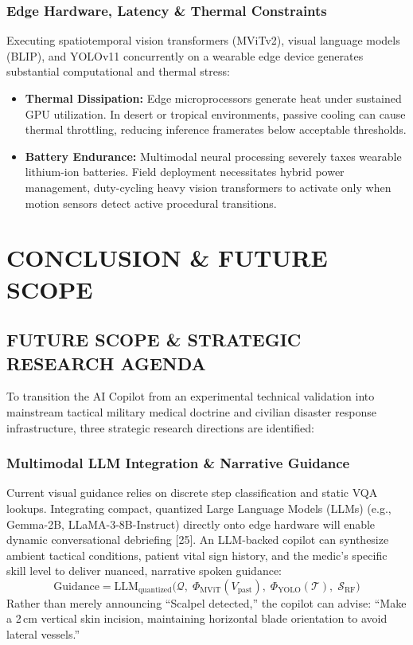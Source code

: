 \documentclass[12pt,a4paper]{report}
\begin{document}
\subsection{Edge Hardware, Latency \& Thermal Constraints}
Executing spatiotemporal vision transformers (MViTv2), visual language models (BLIP), and YOLOv11 concurrently on a wearable edge device generates substantial computational and thermal stress:
\begin{itemize}
    \item \textbf{Thermal Dissipation:} Edge microprocessors generate heat under sustained GPU utilization. In desert or tropical environments, passive cooling can cause thermal throttling, reducing inference framerates below acceptable thresholds.
    \item \textbf{Battery Endurance:} Multimodal neural processing severely taxes wearable lithium-ion batteries. Field deployment necessitates hybrid power management, duty-cycling heavy vision transformers to activate only when motion sensors detect active procedural transitions.
\end{itemize}

\newpage
\chapter{CONCLUSION \& FUTURE SCOPE}

\section{FUTURE SCOPE \& STRATEGIC RESEARCH AGENDA}

To transition the AI Copilot from an experimental technical validation into mainstream tactical military medical doctrine and civilian disaster response infrastructure, three strategic research directions are identified:

\subsection{Multimodal LLM Integration \& Narrative Guidance}
Current visual guidance relies on discrete step classification and static VQA lookups. Integrating compact, quantized Large Language Models (LLMs) (e.g., Gemma-2B, LLaMA-3-8B-Instruct) directly onto edge hardware will enable dynamic conversational debriefing [25]. An LLM-backed copilot can synthesize ambient tactical conditions, patient vital sign history, and the medic's specific skill level to deliver nuanced, narrative spoken guidance:
\begin{equation}
    \text{Guidance} = \text{LLM}_{\text{quantized}}\Big( \mathcal{Q},\; \Phi_{\text{MViT}}(V_{\text{past}}),\; \Phi_{\text{YOLO}}(\mathcal{T}),\; \mathcal{S}_{\text{RF}} \Big)
\end{equation}
Rather than merely announcing ``Scalpel detected,'' the copilot can advise: ``Make a 2\,cm vertical skin incision, maintaining horizontal blade orientation to avoid lateral vessels.''
\end{document}
